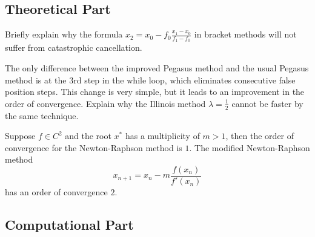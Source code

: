 \subsection{Theoretical Part}
\begin{problem}
Briefly explain why the formula $x_2 = x_0 - f_0 \frac{x_1 - x_0}{f_1 - f_0}$ in bracket methods will not suffer from catastrophic cancellation.
\end{problem}
\begin{problem}
The only difference between the improved Pegasus method and the usual Pegasus method is at the 3rd step in the while loop, which eliminates consecutive false position steps. This change is very simple, but it leads to an improvement in the order of convergence. Explain why the Illinois method $\lambda = \frac{1}{2}$ cannot be faster by the same technique.
\end{problem}
\begin{problem}
Suppose $f\in C^2$ and the root $x^{\ast}$ has a multiplicity of $m>1$, then the order of convergence for the Newton-Raphson method is $1$. The modified Newton-Raphson method
$$
x_{n+1} = x_n - m\frac{f(x_n)}{f'(x_n)}
$$
has an order of convergence $2$.
\end{problem}

\subsection{Computational Part}

